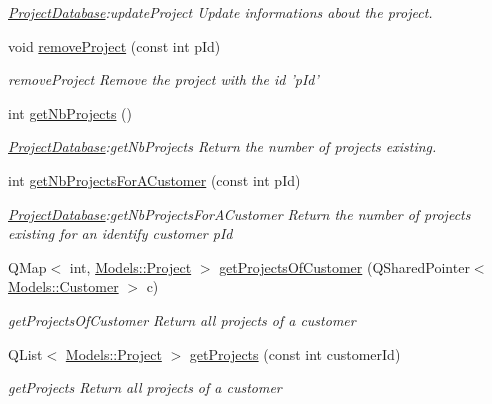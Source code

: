 \begin{DoxyCompactItemize}
\begin{DoxyCompactList}\small\item\em \hyperlink{classDatabases_1_1ProjectDatabase}{Project\-Database}\-:update\-Project Update informations about the project. \end{DoxyCompactList}\item 
void \hyperlink{classDatabases_1_1ProjectDatabase_abdd5fcb1913c2d2f375a658f6656c522}{remove\-Project} (const int p\-Id)
\begin{DoxyCompactList}\small\item\em remove\-Project Remove the project with the id 'p\-Id' \end{DoxyCompactList}\item 
int \hyperlink{classDatabases_1_1ProjectDatabase_aa486ad21f156a8ba7d08baef29e0aaea}{get\-Nb\-Projects} ()
\begin{DoxyCompactList}\small\item\em \hyperlink{classDatabases_1_1ProjectDatabase}{Project\-Database}\-:get\-Nb\-Projects Return the number of projects existing. \end{DoxyCompactList}\item 
int \hyperlink{classDatabases_1_1ProjectDatabase_a9e9a1fb58e4e90fcc568d1c171b863ff}{get\-Nb\-Projects\-For\-A\-Customer} (const int p\-Id)
\begin{DoxyCompactList}\small\item\em \hyperlink{classDatabases_1_1ProjectDatabase}{Project\-Database}\-:get\-Nb\-Projects\-For\-A\-Customer Return the number of projects existing for an identify customer {\itshape p\-Id} \end{DoxyCompactList}\item 
Q\-Map$<$ int, \hyperlink{classModels_1_1Project}{Models\-::\-Project} $>$ \hyperlink{classDatabases_1_1ProjectDatabase_acf044f95bd4df4e04bff9ef52d326704}{get\-Projects\-Of\-Customer} (Q\-Shared\-Pointer$<$ \hyperlink{classModels_1_1Customer}{Models\-::\-Customer} $>$ c)
\begin{DoxyCompactList}\small\item\em get\-Projects\-Of\-Customer Return all projects of a customer \end{DoxyCompactList}\item 
Q\-List$<$ \hyperlink{classModels_1_1Project}{Models\-::\-Project} $>$ \hyperlink{classDatabases_1_1ProjectDatabase_a75963715e3cae349fe3aa555f7226c56}{get\-Projects} (const int customer\-Id)
\begin{DoxyCompactList}\small\item\em get\-Projects Return all projects of a customer \end{DoxyCompactList}\item 

\end{DoxyCompactItemize}
